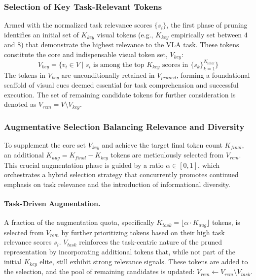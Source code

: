 \subsubsection{Selection of Key Task-Relevant Tokens}
Armed with the normalized task relevance scores $\{s_i\}$, the first phase of pruning identifies an initial set of $K_{key}$ visual tokens (e.g., $K_{key}$ empirically set between 4 and 8) that demonstrate the highest relevance to the VLA task. These tokens constitute the core and indispensable visual token set, $V_{key}$:
\begin{equation}
    V_{key} = \{ v_i \in V \mid s_i \text{ is among the top } K_{key} \text{ scores in } \{s_k\}_{k=1}^{N_{total}} \}
\end{equation}
The tokens in $V_{key}$ are unconditionally retained in $V_{pruned}$, forming a foundational scaffold of visual cues deemed essential for task comprehension and successful execution. The set of remaining candidate tokens for further consideration is denoted as $V_{rem} = V \setminus V_{key}$.

\subsubsection{Augmentative Selection Balancing Relevance and Diversity}
To supplement the core set $V_{key}$ and achieve the target final token count $K_{final}$, an additional $K_{aug} = K_{final} - K_{key}$ tokens are meticulously selected from $V_{rem}$. This crucial augmentation phase is guided by a ratio $\alpha \in [0,1]$, which orchestrates a hybrid selection strategy that concurrently promotes continued emphasis on task relevance and the introduction of informational diversity.

\paragraph{Task-Driven Augmentation.}
A fraction of the augmentation quota, specifically $K_{task} = \lfloor \alpha \cdot K_{aug} \rfloor$ tokens, is selected from $V_{rem}$ by further prioritizing tokens based on their high task relevance scores $s_i$. $V_{task}$ reinforces the task-centric nature of the pruned representation by incorporating additional tokens that, while not part of the initial $K_{key}$ elite, still exhibit strong relevance signals. These tokens are added to the selection, and the pool of remaining candidates is updated: $V_{rem} \leftarrow V_{rem} \setminus V_{task}$.

